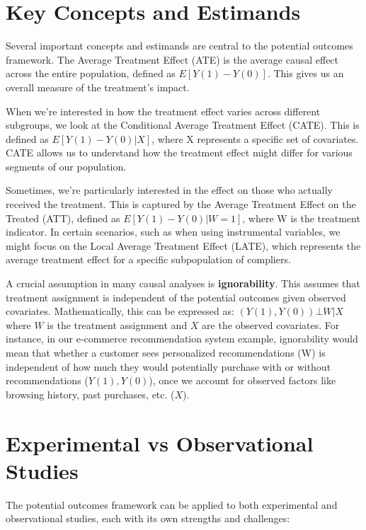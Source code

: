 \documentclass[
  letterpaper,
  DIV=11,
  numbers=noendperiod]{scrreprt}
\begin{document}
\section{Key Concepts and Estimands}\label{key-concepts-and-estimands}

Several important concepts and estimands are central to the potential
outcomes framework. The Average Treatment Effect (ATE) is the average
causal effect across the entire population, defined as
\(E[Y(1) - Y(0)]\). This gives us an overall measure of the treatment's
impact.

When we're interested in how the treatment effect varies across
different subgroups, we look at the Conditional Average Treatment Effect
(CATE). This is defined as \(E[Y(1) - Y(0) | X]\), where X represents a
specific set of covariates. CATE allows us to understand how the
treatment effect might differ for various segments of our population.

Sometimes, we're particularly interested in the effect on those who
actually received the treatment. This is captured by the Average
Treatment Effect on the Treated (ATT), defined as
\(E[Y(1) - Y(0) | W = 1]\), where W is the treatment indicator. In
certain scenarios, such as when using instrumental variables, we might
focus on the Local Average Treatment Effect (LATE), which represents the
average treatment effect for a specific subpopulation of compliers.

A crucial assumption in many causal analyses is \textbf{ignorability}.
This assumes that treatment assignment is independent of the potential
outcomes given observed covariates. Mathematically, this can be
expressed as: \((Y(1), Y(0)) ⊥ W | X\) where \(W\) is the treatment
assignment and \(X\) are the observed covariates. For instance, in our
e-commerce recommendation system example, ignorability would mean that
whether a customer sees personalized recommendations (W) is independent
of how much they would potentially purchase with or without
recommendations (\(Y(1), Y(0)\)), once we account for observed factors
like browsing history, past purchases, etc. (\(X\)).

\section{Experimental vs Observational
Studies}\label{experimental-vs-observational-studies}

The potential outcomes framework can be applied to both experimental and
observational studies, each with its own strengths and challenges:
\end{document}
